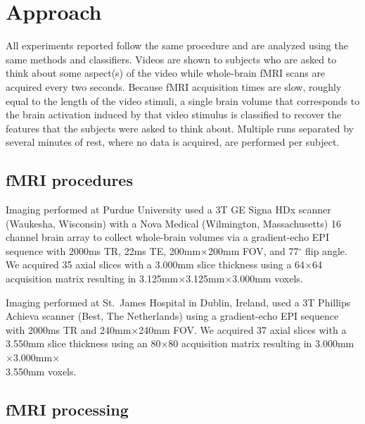 \vspace{-1ex}
\section{Approach}
\label{sec:approach}
\vspace{-1ex}

All experiments reported follow the same procedure and are analyzed using the
same methods and classifiers.
%
Videos are shown to subjects who are asked to think about some aspect(s) of the
video while whole-brain fMRI scans are acquired every two seconds.
%
Because fMRI acquisition times are slow, roughly equal to the length of the
video stimuli, a single brain volume that corresponds to the brain activation
induced by that video stimulus is classified to recover the features that the
subjects were asked to think about.
%
Multiple runs separated by several minutes of rest, where no data is acquired,
are performed per subject.

\subsection{fMRI procedures}
\vspace{-1ex}

\hspace{-3.5pt}Imaging performed at Purdue University used a 3T GE Signa HDx scanner
(Waukesha, Wisconsin) with a Nova Medical (Wilmington, Massachusetts) 16
channel brain array to collect whole-brain volumes via a gradient-echo EPI
sequence with 2000ms TR, 22ms TE, 200mm$\times$200mm FOV, and 77$^{\circ}$ flip
angle.
%
We acquired 35 axial slices with a 3.000mm slice thickness using a 64$\times$64
acquisition matrix resulting in 3.125mm$\times$3.125mm$\times$3.000mm voxels.

Imaging performed at St.~James Hospital in Dublin, Ireland, used a 3T
Phillips Achieva scanner (Best, The Netherlands) using a gradient-echo EPI
sequence with 2000ms TR and 240mm$\times$240mm FOV.\@
%
We acquired 37 axial slices with a 3.550mm slice thickness using an
80$\times$80 acquisition matrix resulting in
3.000mm$\times$3.000mm$\times$\\3.550mm voxels.

\subsection{fMRI processing}

